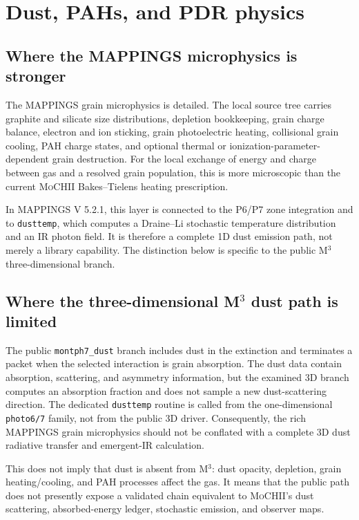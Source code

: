 \documentclass[english,a4paper]{my_memo}
\newcommand{\code}[1]{\texttt{#1}}
\newcommand{\MoCHII}{\textsc{MoCHII}}
\newcommand{\Mthree}{M$^3$}
\newcommand{\Mappings}{MAPPINGS V 5.2.1}
\begin{document}
\section{Dust, PAHs, and PDR physics}

\subsection{Where the MAPPINGS microphysics is stronger}

The MAPPINGS grain microphysics is detailed.  The local source tree carries
graphite and silicate size distributions, depletion bookkeeping, grain
charge balance, electron and ion sticking, grain photoelectric heating,
collisional grain cooling, PAH charge states, and optional thermal or
ionization-parameter-dependent grain destruction.  For the local exchange
of energy and charge between gas and a resolved grain population, this is
more microscopic than the current \MoCHII{} Bakes--Tielens heating
prescription.

In \Mappings{}, this layer is connected to the P6/P7 zone integration and
to \code{dusttemp}, which computes a Draine--Li stochastic temperature
distribution and an IR photon field.  It is therefore a complete 1D dust
emission path, not merely a library capability.  The distinction below is
specific to the public \Mthree{} three-dimensional branch.

\subsection{Where the three-dimensional \texorpdfstring{M$^3$}{M3} dust path is limited}

The public \code{montph7\_dust} branch includes dust in the extinction and
terminates a packet when the selected interaction is grain absorption.
The dust data contain absorption, scattering, and asymmetry information,
but the examined 3D branch computes an absorption fraction and does not
sample a new dust-scattering direction.  The dedicated \code{dusttemp}
routine is called from the one-dimensional \code{photo6/7} family, not
from the public 3D driver.  Consequently, the rich MAPPINGS grain
microphysics should not be conflated with a complete 3D dust radiative
transfer and emergent-IR calculation.

This does not imply that dust is absent from \Mthree{}: dust opacity,
depletion, grain heating/cooling, and PAH processes affect the gas.  It
means that the public path does not presently expose a validated chain
equivalent to \MoCHII{}'s dust scattering, absorbed-energy ledger,
stochastic emission, and observer maps.
\end{document}
